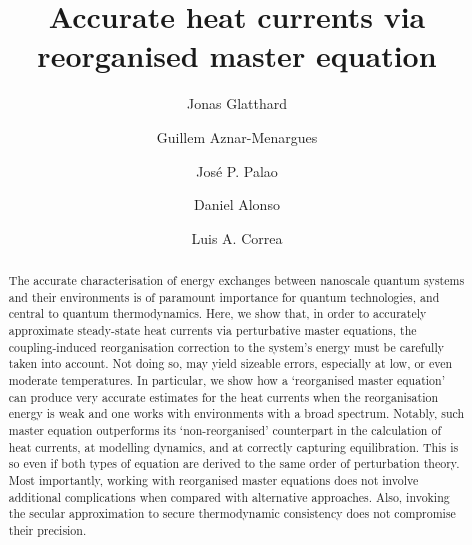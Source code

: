 \documentclass[aps,pra,superscriptaddress,twocolumn,nofootinbib]{revtex4-2}
\begin{document}
\title{Accurate heat currents via reorganised master equation}

\author{Jonas Glatthard}

\author{Guillem Aznar-Menargues}

\author{Jos\'{e} P. Palao}

\author{Daniel Alonso}

\author{Luis A. Correa}

\begin{abstract}
The accurate characterisation of energy exchanges between nanoscale quantum systems and their environments is of paramount importance for quantum technologies, and central to quantum thermodynamics. Here, we show that, in order to accurately approximate steady-state heat currents via perturbative master equations, the coupling-induced reorganisation correction to the system's energy must be carefully taken into account. Not doing so, may yield sizeable errors, especially at low, or even moderate temperatures. In particular, we show how a `reorganised master equation' can produce very accurate estimates for the heat currents when the reorganisation energy is weak and one works with environments with a broad spectrum. Notably, such master equation outperforms its `non-reorganised' counterpart in the calculation of heat currents, at modelling dynamics, and at correctly capturing equilibration. This is so even if both types of equation are derived to the same order of perturbation theory. Most importantly, working with reorganised master equations does not involve additional complications when compared with alternative approaches. Also, invoking the secular approximation to secure thermodynamic consistency does not compromise their precision.
\end{abstract}
\end{document}
